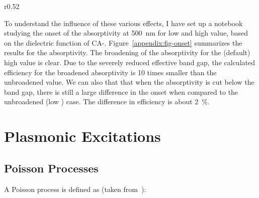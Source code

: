 \begin{refsection}
\begin{wrapfigure}{r}{0.52\textwidth}
\vspace{-2em}
\centering

\caption{Difference in onset of the absorptivity for the settings described in 
the text.}
\label{appendix:fig-onset}
\end{wrapfigure}

To understand the influence of these various effects, I have set up a 
notebook studying the onset of the absorptivity at 500~\si{\nano\meter}
for low and high  value, based on the dielectric function of 
CA-. Figure~\ref{appendix:fig-onset} summarizes the results for 
the absorptivity. The broadening of the absorptivity for the (default) high 
 value is clear. Due to the severely reduced effective band 
gap, the calculated efficiency for the broadened absorptivity is 10 times 
smaller than the unbroadened value. We can also that that when the absorptivity 
is cut below the band gap, there is still a large difference in the onset 
when compared to the unbroadened (low ) case. The difference in 
efficiency is about 2~\%.

\chapter{Plasmonic Excitations} \label{appendix:sec-plasmons} 

\section{Poisson Processes} \label{sec:appendix-poisson} 

A Poisson process is defined as (taken from~\cite{MITopencourseware}):


\end{refsection}
